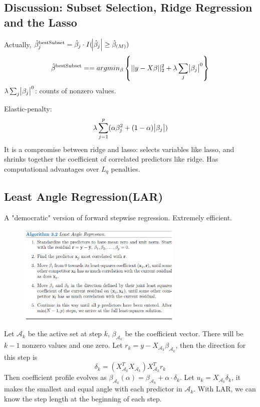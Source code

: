 \subsection{Discussion: Subset Selection, Ridge Regression and the Lasso}
Actually, $\hat{\beta}^{\text{bestSubset}}_j=\hat{\beta}_j\cdot
I(\abs{\hat{\beta}_j}\ge \hat{\beta}_{(M)})$
\begin{equation*}
    \hat{\beta}^{\text{bestSubset}}=
    =argmin_{\beta}\left\{||y-X\beta||_2^2+\lambda \sum_j\abs{\beta_j}^0\right\}
\end{equation*}
$\lambda \sum_j\abs{\beta_j}^0$: counts of nonzero values. 

Elastic-penalty: 
\begin{equation*}
\lambda\sum_{j=1}^p(\alpha\beta_j^2+(1-\alpha)\abs{\beta_j})
\end{equation*}
It is a compromise between ridge and lasso: selects variables like lasso, and 
shrinks together the coefficient of correlated predictors like ridge. Has
computational advantages over $L_q$ penalties. 

\subsection{Least Angle Regression(LAR)}
A "democratic" version of forward stepwise regression. Extremely efficient. 
\begin{figure}[H]
    \centering
    \includegraphics[width=0.7\textwidth]{Figures/LARAlgo}
\end{figure}
Let $\mathcal{A}_k$ be the active set at step $k$, $\beta_{\mathcal{A}_k}$ be the 
coefficient vector. There will be $k-1$ nonzero values and one zero. Let 
$r_k=y-X_{\mathcal{A}_k}\beta_{\mathcal{A}_k}$, then the direction for this step is
\begin{equation*}
\delta_k=(X_{\mathcal{A}_k}^TX_{\mathcal{A}_k})X_{\mathcal{A}_k}^Tr_k
\end{equation*}
Then coefficient profile evolves as
$\beta_{\mathcal{A}_k}(\alpha)=\beta_{\mathcal{A}_k}+\alpha\cdot \delta_k$. 
Let $u_k=X_{\mathcal{A}_k}\delta_k$, it makes the smallest and equal angle with each 
predictor in $\mathcal{A}_k$.  With LAR, we can know the step length at the beginning
of each step. 

